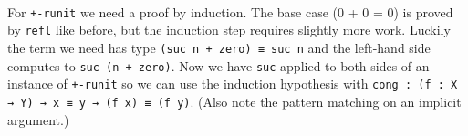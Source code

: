 \begin{code}%
\>[0]\<%
\\
\>[0]\AgdaSpace{}%
\AgdaSymbol{:}\AgdaSpace{}%
\AgdaSpace{}%
\AgdaSymbol{\{}\AgdaSymbol{\}}\AgdaSpace{}%
\AgdaSpace{}%
\AgdaSpace{}%
\AgdaOperator{\AgdaFunction{+}}\AgdaSpace{}%
\AgdaSpace{}%
\AgdaSpace{}%
\<%
\\
\>[0]\AgdaSpace{}%
\AgdaSymbol{\{}\AgdaSymbol{\}}\AgdaSpace{}%
\AgdaSymbol{=}\AgdaSpace{}%
\<%
\\
\>[0]\AgdaSpace{}%
\AgdaSymbol{\{}\AgdaSpace{}%
\AgdaSymbol{\}}\AgdaSpace{}%
\AgdaSymbol{=}\AgdaSpace{}%
\AgdaSpace{}%
\AgdaSpace{}%
\<%
\end{code}
For \texttt{+-runit} we need a proof by induction. The base case (0 + 0 = 0) is proved by \texttt{refl}
like before, but the induction step requires slightly more work.
Luckily the term we need has type \texttt{(suc n + zero) ≡ suc n} and the left-hand side computes to \texttt{suc (n + zero)}.
Now we have \texttt{suc} applied to both sides of an instance of \texttt{+-runit} so we can use the induction hypothesis with \texttt{cong : (f : X → Y) → x ≡ y → (f x) ≡ (f y)}.
(Also note the pattern matching on an implicit argument.)

